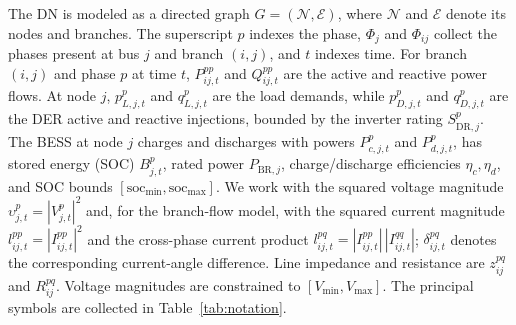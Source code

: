 The DN is modeled as a directed graph $G=(\mathcal{N},\mathcal{E})$,
where $\mathcal{N}$ and $\mathcal{E}$ denote its nodes and branches. The
superscript $p$ indexes the phase, $\Phi_j$ and $\Phi_{ij}$ collect the
phases present at bus $j$ and branch $(i,j)$, and $t$ indexes time.
For branch $(i,j)$ and phase $p$ at time $t$, $P^{pp}_{ij,t}$ and
$Q^{pp}_{ij,t}$ are the active and reactive power flows. At node $j$,
$p^{p}_{L,j,t}$ and $q^{p}_{L,j,t}$ are the load demands, while
$p^{p}_{D,j,t}$ and $q^{p}_{D,j,t}$ are the DER active and reactive
injections, bounded by the inverter rating $S^{p}_{\mathrm{DR},j}$.
The BESS at node $j$ charges and discharges with powers $P^{p}_{c,j,t}$
and $P^{p}_{d,j,t}$, has stored energy (SOC) $B^{p}_{j,t}$, rated power
$P_{\mathrm{BR},j}$, charge/discharge efficiencies $\eta_c,\eta_d$, and
SOC bounds $[\mathrm{soc}_{\min},\mathrm{soc}_{\max}]$. We work with the
squared voltage magnitude $\upsilon^{p}_{j,t}=|V^{p}_{j,t}|^2$ and, for
the branch-flow model, with the squared current magnitude
$l^{pp}_{ij,t}=|I^{pp}_{ij,t}|^2$ and the cross-phase current product
$l^{pq}_{ij,t}=|I^{pp}_{ij,t}|\,|I^{qq}_{ij,t}|$; $\delta^{pq}_{ij,t}$
denotes the corresponding current-angle difference. Line impedance and
resistance are $z^{pq}_{ij}$ and $R^{pq}_{ij}$. Voltage magnitudes are
constrained to $[V_{\min},V_{\max}]$. The principal symbols are
collected in Table~\ref{tab:notation}.


